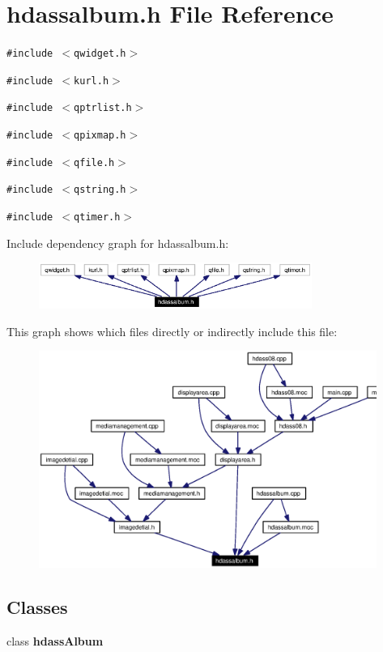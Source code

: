 \section{hdassalbum.h File Reference}
\label{hdassalbum_8h}


{\tt \#include $<$qwidget.h$>$}\par
{\tt \#include $<$kurl.h$>$}\par
{\tt \#include $<$qptrlist.h$>$}\par
{\tt \#include $<$qpixmap.h$>$}\par
{\tt \#include $<$qfile.h$>$}\par
{\tt \#include $<$qstring.h$>$}\par
{\tt \#include $<$qtimer.h$>$}\par


Include dependency graph for hdassalbum.h:\begin{figure}[H]
\begin{center}
\leavevmode
\includegraphics[width=253pt]{hdassalbum_8h__incl}
\end{center}
\end{figure}


This graph shows which files directly or indirectly include this file:\begin{figure}[H]
\begin{center}
\leavevmode
\includegraphics[width=313pt]{hdassalbum_8h__dep__incl}
\end{center}
\end{figure}
\subsection*{Classes}
\begin{CompactItemize}
\item 
class {\bf hdass\-Album}
\end{CompactItemize}
